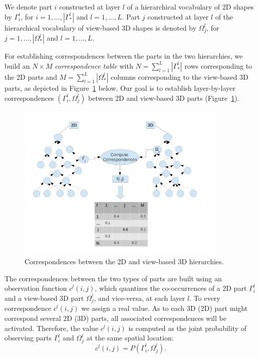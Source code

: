 \documentclass[runningheads]{llncs}
\begin{document}
We denote part $i$ constructed at layer $l$ of a hierarchical vocabulary of 2D shapes by $\Gamma_{i}^{l}$, for $i=1,\ldots,|\Gamma_*^l|$ and $l=1,\ldots,L$. Part $j$ constructed at layer $l$ of the  hierarchical vocabulary of view-based 3D shapes is denoted by $\Omega_{j}^{l}$, for $j=1,\ldots,|\Omega_*^l|$ and $l=1,\ldots,L$.

For establishing correspondences between the parts in the two hierarchies, we build an $N\times M$ \emph{correspondence table} with $N=\sum_{l=1}^L |\Gamma_*^l|$ rows corresponding to the 2D parts and $M=\sum_{l=1}^L |\Omega_*^l|$ columns corresponding to the view-based 3D parts, as depicted in Figure~\ref{fig:fused-models} below.  Our goal is to establish layer-by-layer correspondences $(\Gamma_{i}^l,\Omega_{j}^l)$ between 2D and view-based 3D  parts (Figure~\ref{fig:fused-models}).

\begin{figure}
\begin{center}
\includegraphics[width=0.9\textwidth]{Fused_representation}
\end{center}
\caption{Correspondences between the 2D and view-based 3D hierarchies.}
\label{fig:fused-models}
\end{figure}

The correspondences between the two types of parts are built using an observation function $c^l(i,j)$, which quantizes the co-occurrences of a 2D part $\Gamma_i^l$ and a view-based 3D part $\Omega_j^l$, and vice-versa, at each layer $l$. 
To every correspondence $c^l(i,j)$ we assign a real value. As to each 3D (2D) part might correspond several 2D (3D) parts, all associated correspondences will be activated. Therefore, the value $c^l(i,j)$ is computed as the joint probability of observing parts $\Gamma_i^l$ and $\Omega_j^l$ at the same spatial location:
\begin{equation}
  c^l(i,j) = P(\Gamma_i^l,\Omega_j^l).
  \label{eqn:cij.Pij}
 \end{equation} 
\end{document}
